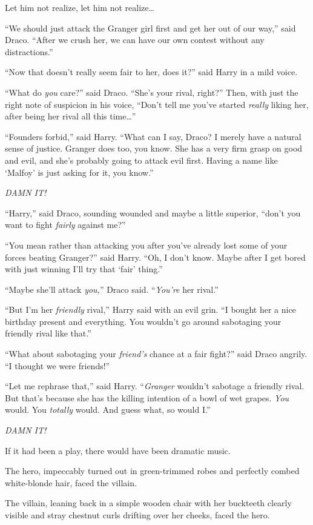 Let him not realize, let him not realize…

“We should just attack the Granger girl first and get her out of our way,” said Draco. “After we crush her, we can have our own contest without any distractions.”

“Now that doesn’t really seem fair to her, does it?” said Harry in a mild voice.

“What do \emph{you} care?” said Draco. “She’s your rival, right?” Then, with just the right note of suspicion in his voice, “Don’t tell me you’ve started \emph{really} liking her, after being her rival all this time…”

“Founders forbid,” said Harry. “What can I say, Draco? I merely have a natural sense of justice. Granger does too, you know. She has a very firm grasp on good and evil, and she’s probably going to attack evil first. Having a name like ‘Malfoy’ is just asking for it, you know.”

\emph{DAMN IT!}

“Harry,” said Draco, sounding wounded and maybe a little superior, “don’t you want to fight \emph{fairly} against me?”

“You mean rather than attacking you after you’ve already lost some of your forces beating Granger?” said Harry. “Oh, I don’t know. Maybe after I get bored with just winning I’ll try that ‘fair’ thing.”

“Maybe she’ll attack \emph{you,}” Draco said. “\emph{You’re} her rival.”

“But I’m her \emph{friendly} rival,” Harry said with an evil grin. “I bought her a nice birthday present and everything. You wouldn’t go around sabotaging your friendly rival like that.”

“What about sabotaging your \emph{friend’s} chance at a fair fight?” said Draco angrily. “I thought we were friends!”

“Let me rephrase that,” said Harry. “\emph{Granger} wouldn’t sabotage a friendly rival. But that’s because she has the killing intention of a bowl of wet grapes. \emph{You} would. You \emph{totally} would. And guess what, so would I.”

\emph{DAMN IT!}

\later

If it had been a play, there would have been dramatic music.

The hero, impeccably turned out in green-trimmed robes and perfectly combed white-blonde hair, faced the villain.

The villain, leaning back in a simple wooden chair with her buckteeth clearly visible and stray chestnut curls drifting over her cheeks, faced the hero.

